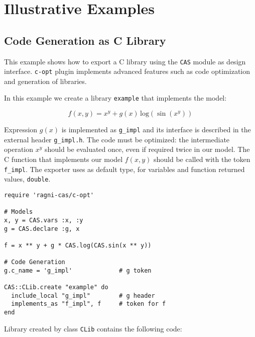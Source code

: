 \section{Illustrative Examples}
\label{sec:examples}

\subsection{Code Generation as C Library}
This example shows how to export a C library using the \texttt{CAS} module as design interface. \texttt{c-opt} plugin implements advanced features such as code optimization and generation of libraries.

In this example we create a library \texttt{example} that implements the model:

\begin{equation}
f(x, y) = x^y + g(x)\, \mathrm{log}(\sin(x^y))
\end{equation}

Expression $g(x)$ is implemented as \texttt{g\_impl} and its interface is described in the external header \texttt{g\_impl.h}. The code must be optimized: the intermediate operation $x^y$ should be evaluated once, even if required twice in our model. The C function that implements our model $f(x,y)$ should be called with the token \texttt{f\_impl}. The exporter uses as default type, for variables and function returned values, \texttt{double}.

\begin{lstlisting}[caption={Calling optimized-C exporter for library generation},label={code:example-exporting-C-1}]
require 'ragni-cas/c-opt'

# Models
x, y = CAS.vars :x, :y
g = CAS.declare :g, x

f = x ** y + g * CAS.log(CAS.sin(x ** y))

# Code Generation
g.c_name = 'g_impl'             # g token

CAS::CLib.create "example" do
  include_local "g_impl"        # g header
  implements_as "f_impl", f     # token for f
end
\end{lstlisting}
Library created by class \texttt{CLib} contains the following code:

\noindent%
  \begin{minipage}{.5\textwidth}
    
  \end{minipage}\hfill
  \begin{minipage}{.5\textwidth}
    
  \end{minipage}

